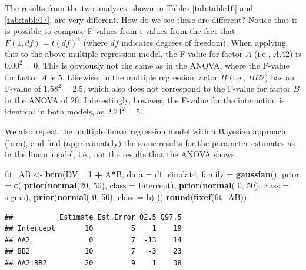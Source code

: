 \documentclass[12pt,]{krantz}
\newenvironment{Shaded}{\begin{snugshade}}{\end{snugshade}}
\newcommand{\DataTypeTok}[1]{\textcolor[rgb]{0.13,0.29,0.53}{#1}}
\newcommand{\DecValTok}[1]{\textcolor[rgb]{0.00,0.00,0.81}{#1}}
\newcommand{\KeywordTok}[1]{\textcolor[rgb]{0.13,0.29,0.53}{\textbf{#1}}}
\newcommand{\NormalTok}[1]{#1}
\newcommand{\OperatorTok}[1]{\textcolor[rgb]{0.81,0.36,0.00}{\textbf{#1}}}
\newcommand{\StringTok}[1]{\textcolor[rgb]{0.31,0.60,0.02}{#1}}
\theoremstyle{definition}
\theoremstyle{definition}
\theoremstyle{definition}
\theoremstyle{remark}
\begin{document}
The results from the two analyses, shown in Tables \ref{tab:table16} and \ref{tab:table17}, are very different.
How do we see these are different? Notice that it is possible to compute F-values from t-values from the fact that \(F(1,df) = t(df)^2\) \citep{snedecor1967statistical} (where \(df\) indicates degrees of freedom). When applying this to the above multiple regression model, the F-value for factor \(A\) (i.e., \(AA2\)) is \(0.00^2 = 0\). This is obviously not the same as in the ANOVA, where the F-value for factor \(A\) is \(5\). Likewise, in the multiple regression factor \(B\) (i.e., \(BB2\)) has an F-value of \(1.58^2 = 2.5\), which also does not correspond to the F-value for factor \(B\) in the ANOVA of \(20\). Interestingly, however, the F-value for the interaction is identical in both models, as \(2.24^2 = 5\).

We also repeat the multiple linear regression model with a Bayesian approach (brm), and find (approximately) the same results for the parameter estimates as in the linear model, i.e., not the results that the ANOVA shows.

\begin{Shaded}
\begin{Highlighting}[]
\NormalTok{fit_AB <-}\StringTok{ }\KeywordTok{brm}\NormalTok{(DV }\OperatorTok{~}\StringTok{ }\DecValTok{1} \OperatorTok{+}\StringTok{ }\NormalTok{A}\OperatorTok{*}\NormalTok{B,}
                 \DataTypeTok{data =}\NormalTok{ df_simdat4,}
                 \DataTypeTok{family =} \KeywordTok{gaussian}\NormalTok{(),}
                 \DataTypeTok{prior =} \KeywordTok{c}\NormalTok{(}
                     \KeywordTok{prior}\NormalTok{(}\KeywordTok{normal}\NormalTok{(}\DecValTok{20}\NormalTok{, }\DecValTok{50}\NormalTok{), }\DataTypeTok{class =}\NormalTok{ Intercept),}
                     \KeywordTok{prior}\NormalTok{(}\KeywordTok{normal}\NormalTok{( }\DecValTok{0}\NormalTok{, }\DecValTok{50}\NormalTok{), }\DataTypeTok{class =}\NormalTok{ sigma),}
                     \KeywordTok{prior}\NormalTok{(}\KeywordTok{normal}\NormalTok{( }\DecValTok{0}\NormalTok{, }\DecValTok{50}\NormalTok{), }\DataTypeTok{class =}\NormalTok{ b)}
\NormalTok{                 )) }
\KeywordTok{round}\NormalTok{(}\KeywordTok{fixef}\NormalTok{(fit_AB))}
\end{Highlighting}
\end{Shaded}

\begin{verbatim}
##           Estimate Est.Error Q2.5 Q97.5
## Intercept       10         5    1    19
## AA2              0         7  -13    14
## BB2             10         7   -3    23
## AA2:BB2         20         9    1    38
\end{verbatim}
\end{document}
